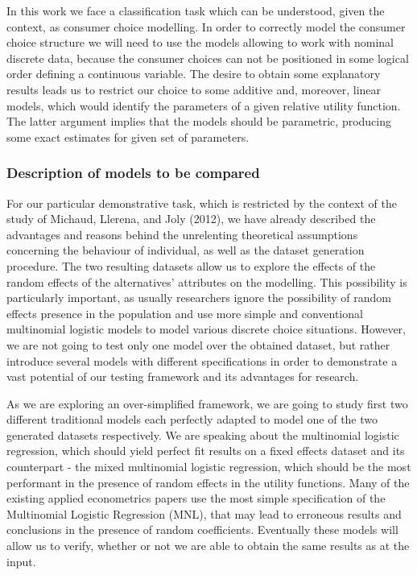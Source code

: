\documentclass[11pt,]{article}
\begin{document}
In this work we face a classification task which can be understood,
given the context, as consumer choice modelling. In order to correctly
model the consumer choice structure we will need to use the models
allowing to work with nominal discrete data, because the consumer
choices can not be positioned in some logical order defining a
continuous variable. The desire to obtain some explanatory results leads
us to restrict our choice to some additive and, moreover, linear models,
which would identify the parameters of a given relative utility
function. The latter argument implies that the models should be
parametric, producing some exact estimates for given set of parameters.

\hypertarget{description-of-models-to-be-compared}{%
\subsubsection{Description of models to be
compared}\label{description-of-models-to-be-compared}}

For our particular demonstrative task, which is restricted by the
context of the study of Michaud, Llerena, and Joly (2012), we have
already described the advantages and reasons behind the unrelenting
theoretical assumptions concerning the behaviour of individual, as well
as the dataset generation procedure. The two resulting datasets allow us
to explore the effects of the random effects of the alternatives'
attributes on the modelling. This possibility is particularly important,
as usually researchers ignore the possibility of random effects presence
in the population and use more simple and conventional multinomial
logistic models to model various discrete choice situations. However, we
are not going to test only one model over the obtained dataset, but
rather introduce several models with different specifications in order
to demonstrate a vast potential of our testing framework and its
advantages for research.

As we are exploring an over-simplified framework, we are going to study
first two different traditional models each perfectly adapted to model
one of the two generated datasets respectively. We are speaking about
the multinomial logistic regression, which should yield perfect fit
results on a fixed effects dataset and its counterpart - the mixed
multinomial logistic regression, which should be the most performant in
the presence of random effects in the utility functions. Many of the
existing applied econometrics papers use the most simple specification
of the Multinomial Logistic Regression (MNL), that may lead to erroneous
results and conclusions in the presence of random coefficients.
Eventually these models will allow us to verify, whether or not we are
able to obtain the same results as at the input.
\end{document}
